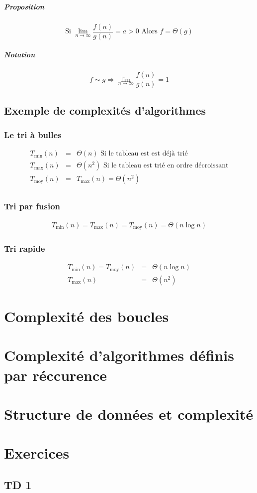 \documentclass[12pt,a4paper,openany]{book}
\newcommand{\moy}{\textrm{moy}}
\begin{document}
	\paragraph{Proposition}
	$$\textrm{Si } \lim_{n \rightarrow \infty} \frac{f(n)}{g(n)} = a > 0 \textrm{ Alors }f = \Theta (g)$$

	\paragraph{Notation} $$f \sim g \Rightarrow \lim_{n\rightarrow \infty} \frac{f(n)}{g(n)} = 1$$
	\section{Exemple de complexités d'algorithmes}
	\subsection{Le tri à bulles}
	\begin{eqnarray*}
		T_{\min} (n) &=& \Theta (n) \textrm{ Si le tableau est est déjà trié}\\
		T_{\max}(n) &=& \Theta(n^2) \textrm{ Si le tableau est trié en ordre décroissant}\\
		T_{\moy}(n) &=& T_{\max}(n) = \Theta(n^2)\\
	\end{eqnarray*}
	\subsection{Tri par fusion}
	\begin{eqnarray*}
		T_{\min}(n) = T_{\max}(n) = T_{\moy}(n) = \Theta (n\log n)
	\end{eqnarray*}
	\subsection{Tri rapide}
	\begin{eqnarray*}
		T_{\min}(n) = T_{\moy}(n) &=& \Theta (n \log n)\\
		T_{\max}(n) &=& \Theta(n^2)
	\end{eqnarray*}
	\chapter{Complexité des boucles}
	\chapter{Complexité d'algorithmes définis par réccurence}
	\chapter{Structure de données et complexité}
	
	\appendix
	\chapter{Exercices}
	\section{TD 1}
\end{document}
